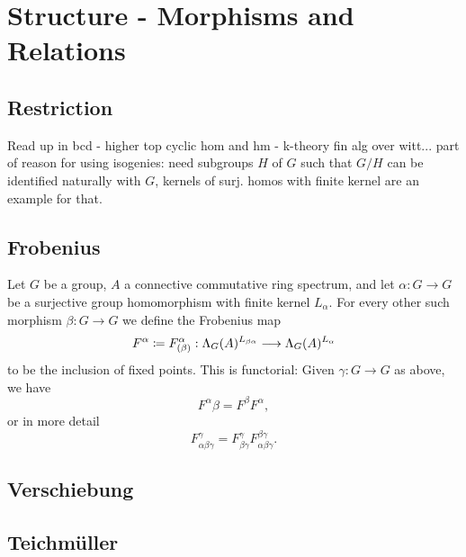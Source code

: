 \section{Structure - Morphisms and Relations}
\subsection{Restriction}
Read up in bcd - higher top cyclic hom and  hm - k-theory fin alg over witt...
part of reason for using isogenies: need subgroups $H$ of $G$ such that $G/H$ can be identified naturally with $G$, kernels of surj. homos with finite kernel are an example for that.
\subsection{Frobenius}
\begin{defn}\label{def_frobenius_and_functoriality}
Let $G$ be a group, $A$ a connective commutative ring spectrum, and let $\alpha : G \to G$ be a surjective group homomorphism with finite kernel $L_\alpha$. For every other such morphism $\beta: G \to G$ we define the Frobenius map
\[ F^\alpha \coloneqq F^\alpha_{(\beta)}: \Lambda_G(A)^{ L_{\beta\alpha} } \longrightarrow \Lambda_G(A)^{ L_\alpha } \]
to be the inclusion of fixed points. This is functorial: Given $\gamma: G \to G$ as above, we have
\[ F^\alpha\beta = F^\beta F^\alpha, \]
or in more detail
\[ F^{\gamma}_{\alpha\beta\gamma} = F^{\gamma}_{\beta\gamma} F^{\beta\gamma}_{\alpha\beta\gamma}. \]

\end{defn}

\subsection{Verschiebung}
\subsection{Teichm\"uller}
\begin{defn}\label{def_Delta_alpha}\cite[Sec. 6.2]{brun2010covering}
\comm{[insert here def of $\Delta_\alpha: A \to T^\alpha$[}
\end{defn}
\begin{prop}\label{prop_iso_degree_0_structure_map_lambda}\cite[Prop. 6.2.4]{brun2010covering}
\end{prop}
